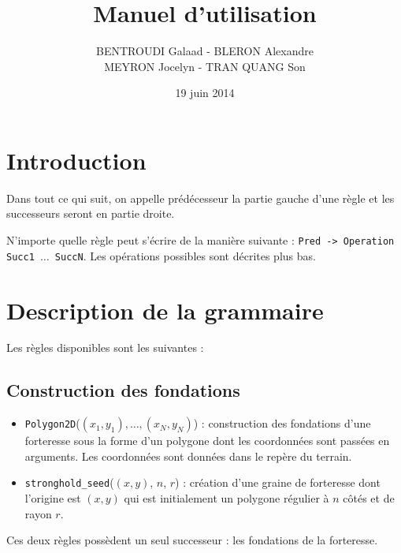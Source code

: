 \documentclass[a4paper,11pt]{article}
\title{Manuel d'utilisation}
\author{BENTROUDI Galaad - BLERON Alexandre\\MEYRON Jocelyn - TRAN QUANG Son}
\date{19 juin 2014}
\begin{document}
\maketitle

\section{Introduction}

Dans tout ce qui suit, on appelle \og prédécesseur \fg la partie gauche d'une règle et les successeurs seront en partie droite.

N'importe quelle règle peut s'écrire de la manière suivante : \texttt{Pred -> Operation Succ1 $ \ldots $ SuccN}.
Les opérations possibles sont décrites plus bas.

\section{Description de la grammaire}

Les règles disponibles sont les suivantes :

\subsection{Construction des fondations}
\begin{itemize}
    \item \texttt{Polygon2D}($(x_1, y_1), \ldots, (x_N, y_N) $) : construction des fondations d'une forteresse sous la forme d'un polygone dont les coordonnées sont passées en arguments. Les coordonnées sont données dans le repère du terrain.
    \item \texttt{stronghold\_seed}($ (x, y) $, $ n $, $ r $) : création d'une graine de forteresse dont l'origine est $ (x, y) $ qui est initialement un polygone régulier à $ n $ côtés et de rayon $ r $.
\end{itemize}
Ces deux règles possèdent un seul successeur : les fondations de la forteresse.
\end{document}
